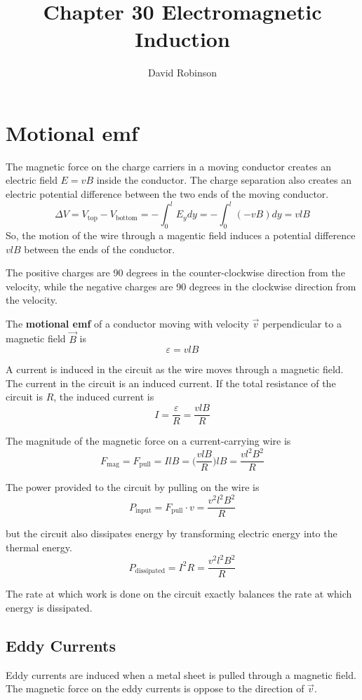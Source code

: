 \documentclass{article}
\title{Chapter 30 Electromagnetic Induction}
\author{David Robinson}
\date{}
\begin{document}
\maketitle

\section*{Motional emf}
The magnetic force on the charge carriers in a moving conductor creates an electric field $E=vB$
inside the conductor. The charge separation also creates an electric potential difference between
the two ends of the moving conductor.
\[\Delta V=V_\text{top} - V_\text{bottom} = -\int_0^l E_y dy =-\int_0^l (-vB)dy=vlB\]
So, the motion of the wire through a magentic field induces a potential difference $vlB$ between
the ends of the conductor.

\vspace{1em}
The positive charges are 90 degrees in the counter-clockwise direction from the velocity, while the
negative charges are 90 degrees in the clockwise direction from the velocity.

\vspace{1em}
The \textbf{motional emf} of a conductor moving with velocity $\vec{v}$ perpendicular to a magnetic
field $\vec{B}$ is \[\varepsilon=vlB\]

A current is induced in the circuit as the wire moves through a magnetic field. The current in the
circuit is an induced current. If the total resistance of the circuit is $R$, the induced current
is \[I=\frac{\varepsilon}{R}=\frac{vlB}{R}\]

The magnitude of the magnetic force on a current-carrying wire is
\[F_\text{mag}=F_\text{pull}=IlB=\Big(\frac{vlB}{R}\Big)lB=\frac{vl^2B^2}{R}\]

The power provided to the circuit by pulling on the wire is
\[P_\text{input}=F_\text{pull} \cdot v=\frac{v^2 l^2 B^2}{R}\]

but the circuit also dissipates energy by transforming electric energy into the thermal energy.
\[P_\text{dissipated}=I^2 R=\frac{v^2 l^2 B^2}{R}\]

The rate at which work is done on the circuit exactly balances the rate at which energy is
dissipated.

\subsection*{Eddy Currents}
Eddy currents are induced when a metal sheet is pulled through a magnetic field. The magnetic force
on the eddy currents is oppose to the direction of $\vec{v}$.
\end{document}
